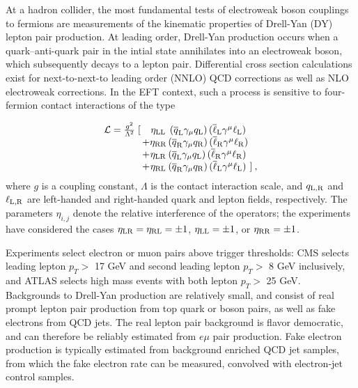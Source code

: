 At a hadron collider, the most fundamental tests of electroweak boson couplings
to fermions are measurements of the kinematic properties of Drell-Yan (DY)
lepton pair production.  At leading order, Drell-Yan production occurs when a
quark--anti-quark pair in the intial state annihilates into an electroweak
boson, which subsequently decays to a lepton pair. Differential cross section
calculations exist for next-to-next-to leading order (NNLO) QCD corrections as
well as NLO electroweak corrections. In the EFT context, such a
process is sensitive to four-fermion contact interactions of the type

\begin{equation}\label{lagrangian}
\begin{array}{r@{\,}c@{}c@{\,}l@{\,}l}
\mathcal L = \frac{g^2}{\Lambda^2}\;[ && \eta_{\rm LL}&\, (\overline q_{\rm L}\gamma_{\mu} q_{\rm L})\,(\overline\ell_{\rm L}\gamma^{\mu}\ell_{\rm L}) \nonumber \\
& +&\eta_{\rm RR}& (\overline q_{\rm R}\gamma_{\mu} q_{\rm R}) \,(\overline\ell_{\rm R}\gamma^{\mu}\ell_{\rm R}) \\
&+&\eta_{\rm LR}& (\overline q_{\rm L}\gamma_{\mu} q_{\rm L}) \,(\overline\ell_{\rm R}\gamma^{\mu}\ell_{\rm R}) \\
&+&\eta_{\rm RL}& (\overline q_{\rm R}\gamma_{\mu} q_{\rm R}) \,(\overline\ell_{\rm L}\gamma^{\mu}\ell_{\rm L})& ] \: ,\nonumber
\end{array}
\end{equation}
where $g$ is a coupling constant, $\Lambda$ is the contact interaction scale,
and $q_{\rm L,R}$ and $\ell_{\rm L,R}$ are left-handed and right-handed quark and
lepton fields, respectively. The parameters $\eta_{i,j}$ denote the relative interference of the operators;
the experiments have considered the cases $\eta_{\rm LR} = \eta_{\rm RL} = \pm 1$,
$\eta_{\rm LL} = \pm 1$, or $\eta_{\rm RR} = \pm 1$.

Experiments select electron or muon pairs above trigger thresholds: CMS selects
leading lepton $p_T >$ 17 GeV and second leading lepton $p_T >$ 8 GeV inclusively,
and ATLAS selects high mass events with both lepton $p_T >$ 25 GeV.  Backgrounds to Drell-Yan production
are relatively small, and consist of real prompt lepton pair production from top quark or boson pairs,
as well as fake electrons from QCD jets.  The real lepton pair background is flavor democratic,
and can therefore be reliably estimated from $e\mu$ pair production.  Fake electron production
is typically estimated from background enriched QCD jet samples, from which the fake electron rate can be measured,
convolved with electron-jet control samples.


